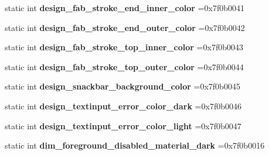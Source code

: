 \begin{DoxyCompactItemize}
static int {\bfseries design\+\_\+fab\+\_\+stroke\+\_\+end\+\_\+inner\+\_\+color} =0x7f0b0041
\item 
\mbox{\label{classandroid_1_1support_1_1graphics_1_1drawable_1_1R_1_1color_a40e8a521bb1cab444ef9e9c3f9329b42}} 
static int {\bfseries design\+\_\+fab\+\_\+stroke\+\_\+end\+\_\+outer\+\_\+color} =0x7f0b0042
\item 
\mbox{\label{classandroid_1_1support_1_1graphics_1_1drawable_1_1R_1_1color_ac3320164e759bb83d29808dcc519c039}} 
static int {\bfseries design\+\_\+fab\+\_\+stroke\+\_\+top\+\_\+inner\+\_\+color} =0x7f0b0043
\item 
\mbox{\label{classandroid_1_1support_1_1graphics_1_1drawable_1_1R_1_1color_a46ec9f912b53639b6a4073ef480e8081}} 
static int {\bfseries design\+\_\+fab\+\_\+stroke\+\_\+top\+\_\+outer\+\_\+color} =0x7f0b0044
\item 
\mbox{\label{classandroid_1_1support_1_1graphics_1_1drawable_1_1R_1_1color_a3eb0b76eb57ab1f7a4ce2521cf54fcdf}} 
static int {\bfseries design\+\_\+snackbar\+\_\+background\+\_\+color} =0x7f0b0045
\item 
\mbox{\label{classandroid_1_1support_1_1graphics_1_1drawable_1_1R_1_1color_a02a9b5f0db73b853a303ab00c467bd8c}} 
static int {\bfseries design\+\_\+textinput\+\_\+error\+\_\+color\+\_\+dark} =0x7f0b0046
\item 
\mbox{\label{classandroid_1_1support_1_1graphics_1_1drawable_1_1R_1_1color_a2ff02dcfe52af791dac1dc210db35f2a}} 
static int {\bfseries design\+\_\+textinput\+\_\+error\+\_\+color\+\_\+light} =0x7f0b0047
\item 
\mbox{\label{classandroid_1_1support_1_1graphics_1_1drawable_1_1R_1_1color_aa679775bfdce218cf5009db59c7a7a6f}} 
static int {\bfseries dim\+\_\+foreground\+\_\+disabled\+\_\+material\+\_\+dark} =0x7f0b0016

\end{DoxyCompactItemize}
